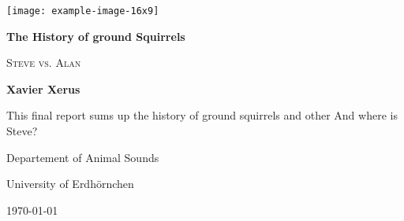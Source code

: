 \documentclass[12pt,twoside]{report}
\begin{document}
\begin{titlepage}
\begin{center}
 \texttt{[image: example-image-16x9]}\par
\vspace{1.5cm}
	{\LARGE\bfseries The History of ground Squirrels\par}
\vspace{0.5cm}
	{\Large\scshape Steve vs. Alan\par}
\vspace{1cm}
\textbf{Xavier Xerus}
\vfill
	\begin{center}
		\parbox{.8\textwidth}{
			This final report sums up the history of ground squirrels and other \lipsum[1] And where is Steve?}
	\end{center}
\vfill
Departement of Animal Sounds\par
University of Erdh\"ornchen\par
\today
\end{center}
\end{titlepage}
\end{document}
